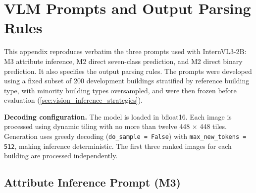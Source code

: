 \chapter{VLM Prompts and Output Parsing Rules}
\label{ch:appendix_c}

This appendix reproduces verbatim the three prompts used with InternVL3-2B: M3 attribute inference, M2 direct seven-class prediction, and M2 direct binary prediction.
It also specifies the output parsing rules.
The prompts were developed using a fixed subset of 200 development buildings stratified by reference building type, with minority building types oversampled, and were then frozen before evaluation (\cref{sec:vision_inference_strategies}).

\textbf{Decoding configuration.}
The model is loaded in bfloat16.
Each image is processed using dynamic tiling with no more than twelve 448 $\times$ 448 tiles.
Generation uses greedy decoding (\texttt{do\_sample = False}) with \texttt{max\_new\_tokens = 512}, making inference deterministic.
The first three ranked images for each building are processed independently.

\section{Attribute Inference Prompt (M3)}
\label{sec:appendix_c_attribute_prompt}

